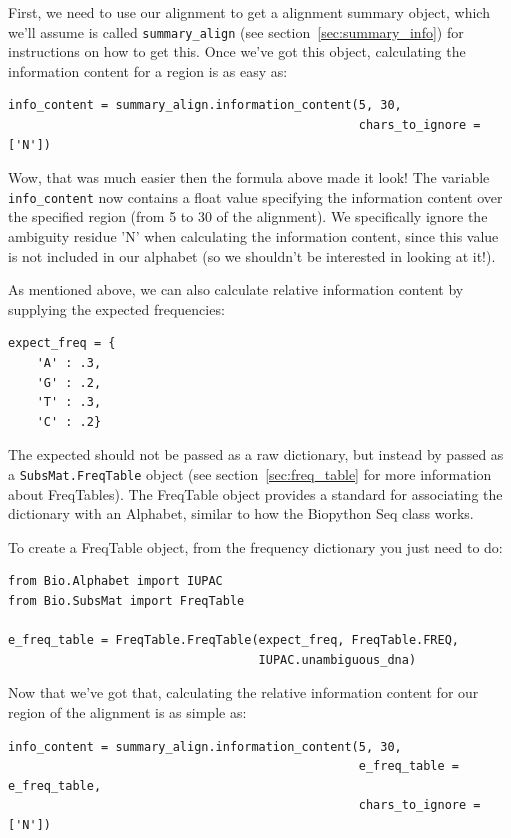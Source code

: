 \documentclass{report}
\begin{document}
First, we need to use our alignment to get a alignment summary object, which we'll assume is called \verb|summary_align| (see section~\ref{sec:summary_info}) for instructions on how to get this. Once we've got this object, calculating the information content for a region is as easy as:

\begin{verbatim}
info_content = summary_align.information_content(5, 30,
                                                 chars_to_ignore = ['N'])
\end{verbatim}

Wow, that was much easier then the formula above made it look! The variable \verb|info_content| now contains a float value specifying the information content over the specified region (from 5 to 30 of the alignment). We specifically ignore the ambiguity residue 'N' when calculating the information content, since this value is not included in our alphabet (so we shouldn't be interested in looking at it!).

As mentioned above, we can also calculate relative information content by supplying the expected frequencies:

\begin{verbatim}
expect_freq = {
    'A' : .3,
    'G' : .2,
    'T' : .3,
    'C' : .2}
\end{verbatim}

The expected should not be passed as a raw dictionary, but instead by passed as a \verb|SubsMat.FreqTable| object (see section~\ref{sec:freq_table} for more information about FreqTables). The FreqTable object provides a standard for associating the dictionary with an Alphabet, similar to how the Biopython Seq class works.

To create a FreqTable object, from the frequency dictionary you just need to do:

\begin{verbatim}
from Bio.Alphabet import IUPAC
from Bio.SubsMat import FreqTable

e_freq_table = FreqTable.FreqTable(expect_freq, FreqTable.FREQ,
                                   IUPAC.unambiguous_dna)
\end{verbatim}

Now that we've got that, calculating the relative information content for our region of the alignment is as simple as:

\begin{verbatim}
info_content = summary_align.information_content(5, 30,
                                                 e_freq_table = e_freq_table,
                                                 chars_to_ignore = ['N'])
\end{verbatim}
\end{document}
